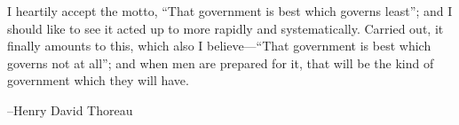 \documentclass[fleqn,addpoints]{exam}
\begin{document}
\else
\vspace{4 in}

\begin{em}
  I heartily accept the motto, ``That government is best which governs least''; and I should like to see it acted up to
  more rapidly and systematically. Carried out, it finally amounts to this, which also I believe---``That government is
  best which governs not at all''; and when men are prepared for it, that will be the kind of government which they will
  have.
\end{em}

\vspace{0.1 in}
\hspace{0.5 in} --Henry David Thoreau

\fi
\end{document}

